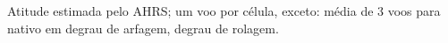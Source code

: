Atitude estimada pelo AHRS; um voo por célula, exceto: média de 3 voos para nativo em degrau de arfagem, degrau de rolagem.
